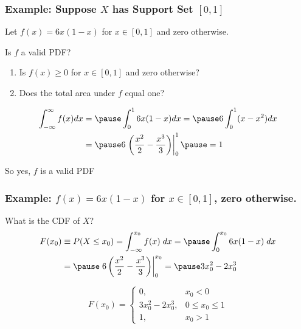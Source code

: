 \begin{frame}
  \frametitle{Example: Suppose $X$ has Support Set $[0,1]$}

  Let $f(x) = 6x(1-x)$ for $x \in [0,1]$ and zero otherwise.

\vspace{2em}

\begin{alertblock}{Is $f$ a valid PDF?}
  \begin{enumerate}
    \item Is $f(x) \geq 0$ for $x \in [0,1]$ and zero otherwise? 
    \item Does the total area under $f$ equal one?
  \end{enumerate}
  \begin{eqnarray*}
    \int_{-\infty}^{\infty} f(x)dx &= \pause \displaystyle \int_{0}^1 6x(1-x)dx = \pause 6\int_0^1 (x - x^2)dx\\
    &= \pause\displaystyle 6\left.\left( \frac{x^2}{2} - \frac{x^3}{3} \right)\right|_0^1 \pause = 1
  \end{eqnarray*}
\end{alertblock}

\hfill\alert{So yes, $f$ is a valid PDF \checkmark}



\end{frame}
\begin{frame}
  \frametitle{Example: $f(x) = 6x(1-x)$ for $x \in [0,1]$, zero otherwise.}

  \begin{block}{What is the CDF of $X$?}
    \begin{align*}
      F(x_0) &\equiv P(X \leq x_0) = \int_{-\infty}^{x_0} f(x)\; dx = \pause \int_{0}^{x_0} 6x(1-x) \; dx\\
      &= \pause \left. 6\left( \frac{x^2}{2} - \frac{x^3}{3} \right)\right|_0^{x_0} = \pause 3x_0^2 - 2x_0^3 
    \end{align*}

  \pause

  \vspace{2em}
  
  \[
    F(x_0) = \left\{
    \begin{array}{lr}
      0, & x_0 < 0\\
      3x_0^2 - 2x_0^3, & 0 \leq x_0 \leq 1\\
      1, & x_0 > 1
    \end{array}
    \right.
  \]

  \end{block}


\end{frame}
